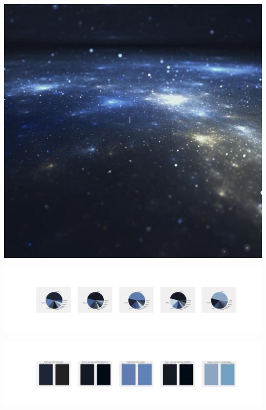\documentclass[11pt]{article}
\begin{document}
\begin{landscape}
    \begin{center}
    \includegraphics[width=\textwidth]{./nbimg/file (183).jpg}
    \end{center}

    \begin{center}
    \includegraphics[width=250mm]{./nbimg/pie-93.jpg}
    \end{center}

    \begin{center}
    \includegraphics[width=250mm]{./nbimg/peak-93.jpg}
    \end{center}
    


\end{landscape}
\end{document}
